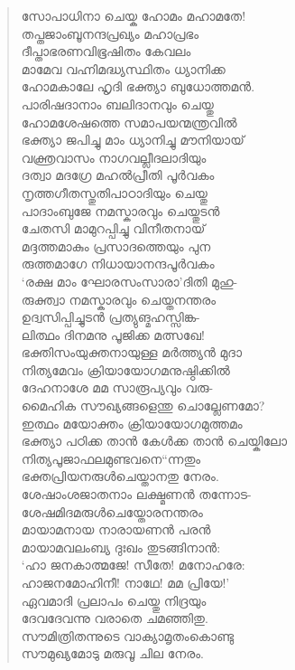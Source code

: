 \begin{verse}
സോപാധിനാ ചെയ്ക ഹോമം മഹാമതേ!\\
തപ്തജാംബൂനന്ദപ്രഖ്യം മഹാപ്രഭം\\
ദീപ്താഭരണവിഭൂഷിതം കേവലം\\
മാമേവ വഹ്നിമദ്ധ്യസ്ഥിതം ധ്യാനിക്ക\\
ഹോമകാലേ ഹൃദി ഭക്ത്യാ ബുധോത്തമന്‍.\\
പാരിഷദാനാം ബലിദാനവും ചെയ്തു\\
ഹോമശേഷത്തെ സമാപയന്മന്ത്രവില്‍\\
ഭക്ത്യാ ജപിച്ചു മാം ധ്യാനിച്ചു മൗനിയായ്\\
വക്ത്രവാസം നാഗവല്ലീദലാദിയും\\
ദത്വാ മദഗ്രേ മഹല്‍പ്രീതി പൂര്‍വകം\\
നൃത്തഗീതസ്തുതിപാഠാദിയും ചെയ്തു\\
പാദാംബുജേ നമസ്കാരവും ചെയ്തുടന്‍\\
ചേതസി മാമുറപ്പിച്ചു വിനീതനായ്\\
മദ്ദത്തമാകും പ്രസാദത്തെയും പുന\\
രുത്തമാഗേ നിധായാനന്ദപൂര്‍വകം\\
‘രക്ഷ മാം ഘോരസംസാരാ’ദിതി മുഹു-\\
രുക്ത്വാ നമസ്കാരവും ചെയ്തനന്തരം\\
ഉദ്വസിപ്പിച്ചുടന്‍ പ്രത്യുങ്മഹസ്സിങ്ക-\\
ലിത്ഥം ദിനമനു പൂജിക്ക മത്സഖേ!\\
ഭക്തിസംയുക്തനായുള്ള മര്‍ത്ത്യന്‍ മുദാ\\
നിത്യമേവം ക്രിയായോഗമനുഷ്ഠിക്കില്‍\\
ദേഹനാശേ മമ സാരൂപ്യവും വരു-\\
മൈഹിക സൗഖ്യങ്ങളെന്തു ചൊല്ലേണമോ?\\
ഇത്ഥം മയോക്തം ക്രിയായോഗമുത്തമം\\
ഭക്ത്യാ പഠിക്ക താന്‍ കേള്‍ക്ക താന്‍ ചെയ്കിലോ\\
നിത്യപൂജാഫലമുണ്ടവനെ“ന്നതും\\
ഭക്തപ്രിയനരുള്‍ചെയ്താനതു നേരം.\\
ശേഷാംശജാതനാം ലക്ഷ്മണന്‍ തന്നോട-\\
ശേഷമിദമരുള്‍ചെയ്തോരനന്തരം\\
മായാമനായ നാരായണന്‍ പരന്‍\\
മായാമവലംബ്യ ദുഃഖം തുടങ്ങിനാന്‍:\\
‘ഹാ ജനകാത്മജേ! സീതേ! മനോഹരേ:\\
ഹാജനമോഹിനീ! നാഥേ! മമ പ്രിയേ!’\\
ഏവമാദി പ്രലാപം ചെയ്തു നിദ്രയും\\
ദേവദേവന്നു വരാതെ ചമഞ്ഞിതു.\\
സൗമിത്രിതന്നുടെ വാക്യാമൃതംകൊണ്ടു\\
സൗമുഖ്യമോടു മരുവൂ ചില നേരം.
\end{verse}

